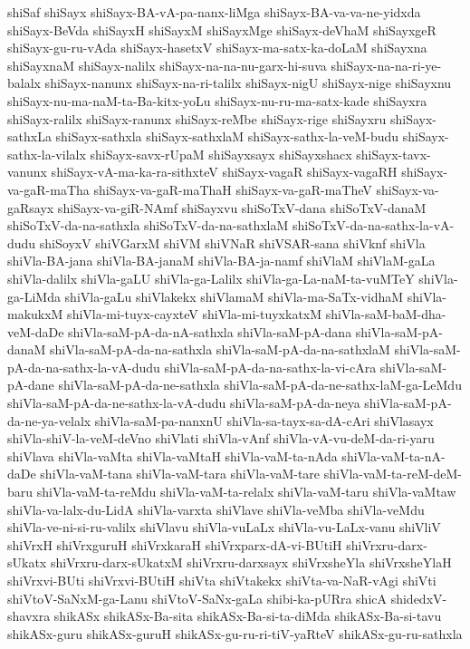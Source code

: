 {shiSaf
shiSayx
shiSayx-BA-vA-pa-nanx-liMga
shiSayx-BA-va-va-ne-yidxda
shiSayx-BeVda
shiSayxH
shiSayxM
shiSayxMge
shiSayx-deVhaM
shiSayxgeR
shiSayx-gu-ru-vAda
shiSayx-hasetxV
shiSayx-ma-satx-ka-doLaM
shiSayxna
shiSayxnaM
shiSayx-nalilx
shiSayx-na-na-nu-garx-hi-suva
shiSayx-na-na-ri-ye-balalx
shiSayx-nanunx
shiSayx-na-ri-talilx
shiSayx-nigU
shiSayx-nige
shiSayxnu
shiSayx-nu-ma-naM-ta-Ba-kitx-yoLu
shiSayx-nu-ru-ma-satx-kade
shiSayxra
shiSayx-ralilx
shiSayx-ranunx
shiSayx-reMbe
shiSayx-rige
shiSayxru
shiSayx-sathxLa
shiSayx-sathxla
shiSayx-sathxlaM
shiSayx-sathx-la-veM-budu
shiSayx-sathx-la-vilalx
shiSayx-savx-rUpaM
shiSayxsayx
shiSayxshacx
shiSayx-tavx-vanunx
shiSayx-vA-ma-ka-ra-sithxteV
shiSayx-vagaR
shiSayx-vagaRH
shiSayx-va-gaR-maTha
shiSayx-va-gaR-maThaH
shiSayx-va-gaR-maTheV
shiSayx-va-gaRsayx
shiSayx-va-giR-NAmf
shiSayxvu
shiSoTxV-dana
shiSoTxV-danaM
shiSoTxV-da-na-sathxla
shiSoTxV-da-na-sathxlaM
shiSoTxV-da-na-sathx-la-vA-dudu
shiSoyxV
shiVGarxM
shiVM
shiVNaR
shiVSAR-sana
shiVknf
shiVla
shiVla-BA-jana
shiVla-BA-janaM
shiVla-BA-ja-namf
shiVlaM
shiVlaM-gaLa
shiVla-dalilx
shiVla-gaLU
shiVla-ga-Lalilx
shiVla-ga-La-naM-ta-vuMTeY
shiVla-ga-LiMda
shiVla-gaLu
shiVlakekx
shiVlamaM
shiVla-ma-SaTx-vidhaM
shiVla-makukxM
shiVla-mi-tuyx-cayxteV
shiVla-mi-tuyxkatxM
shiVla-saM-baM-dha-veM-daDe
shiVla-saM-pA-da-nA-sathxla
shiVla-saM-pA-dana
shiVla-saM-pA-danaM
shiVla-saM-pA-da-na-sathxla
shiVla-saM-pA-da-na-sathxlaM
shiVla-saM-pA-da-na-sathx-la-vA-dudu
shiVla-saM-pA-da-na-sathx-la-vi-cAra
shiVla-saM-pA-dane
shiVla-saM-pA-da-ne-sathxla
shiVla-saM-pA-da-ne-sathx-laM-ga-LeMdu
shiVla-saM-pA-da-ne-sathx-la-vA-dudu
shiVla-saM-pA-da-neya
shiVla-saM-pA-da-ne-ya-velalx
shiVla-saM-pa-nanxnU
shiVla-sa-tayx-sa-dA-cAri
shiVlasayx
shiVla-shiV-la-veM-deVno
shiVlati
shiVla-vAnf
shiVla-vA-vu-deM-da-ri-yaru
shiVlava
shiVla-vaMta
shiVla-vaMtaH
shiVla-vaM-ta-nAda
shiVla-vaM-ta-nA-daDe
shiVla-vaM-tana
shiVla-vaM-tara
shiVla-vaM-tare
shiVla-vaM-ta-reM-deM-baru
shiVla-vaM-ta-reMdu
shiVla-vaM-ta-relalx
shiVla-vaM-taru
shiVla-vaMtaw
shiVla-va-lalx-du-LidA
shiVla-varxta
shiVlave
shiVla-veMba
shiVla-veMdu
shiVla-ve-ni-si-ru-valilx
shiVlavu
shiVla-vuLaLx
shiVla-vu-LaLx-vanu
shiVliV
shiVrxH
shiVrxguruH
shiVrxkaraH
shiVrxparx-dA-vi-BUtiH
shiVrxru-darx-sUkatx
shiVrxru-darx-sUkatxM
shiVrxru-darxsayx
shiVrxsheYla
shiVrxsheYlaH
shiVrxvi-BUti
shiVrxvi-BUtiH
shiVta
shiVtakekx
shiVta-va-NaR-vAgi
shiVti
shiVtoV-SaNxM-ga-Lanu
shiVtoV-SaNx-gaLa
shibi-ka-pURra
shicA
shidedxV-shavxra
shikASx
shikASx-Ba-sita
shikASx-Ba-si-ta-diMda
shikASx-Ba-si-tavu
shikASx-guru
shikASx-guruH
shikASx-gu-ru-ri-tiV-yaRteV
shikASx-gu-ru-sathxla
}
